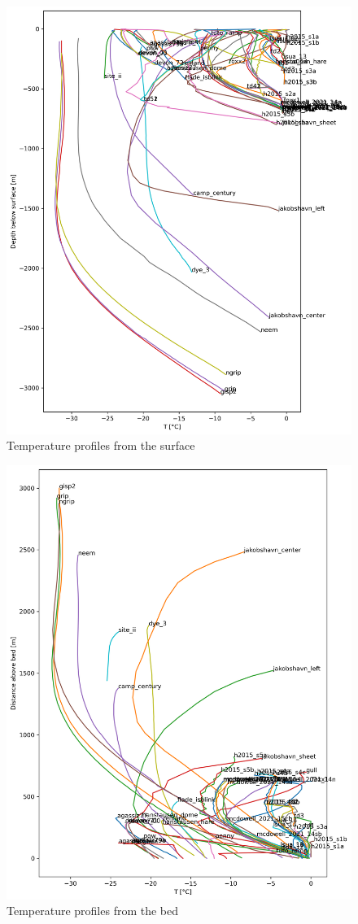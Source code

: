 \documentclass[article,a4paper,times,11pt,twoside]{article}
\begin{document}
\begin{figure}[!h]
\centering
\includegraphics[width=.9\linewidth]{./T_surf.png}
\caption{\label{fig:T_surf}Temperature profiles from the surface}
\end{figure}

\begin{figure}[!h]
\centering
\includegraphics[width=.9\linewidth]{./T_bed.png}
\caption{\label{fig:T_bed}Temperature profiles from the bed}
\end{figure}
\end{document}
